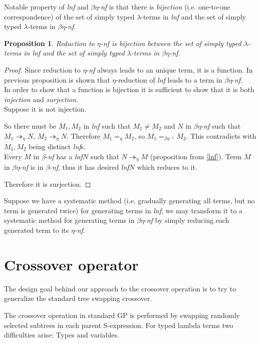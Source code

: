 \documentclass{sig-alternate}
\newtheorem{proposition}{Proposition}
\newcommand{\lterms}{$\lambda$-terms\xspace}
\newcommand{\etar}{\twoheadrightarrow_\eta}
\newcommand{\ered}{$\eta$-reduction\xspace}
\newcommand{\bnf}{$\beta$-\textit{nf}\xspace}
\newcommand{\enf}{$\eta$-\textit{nf}\xspace}
\newcommand{\benf}{$\beta\eta$-\textit{nf}\xspace}
\newcommand{\lnf}{\textit{lnf}\xspace}
\begin{document}
Notable property of \lnf and \benf is that there is \textit{bijection} 
(i.e. one-to-one correspondence) of 
the set of simply typed \lterms in \lnf and 
the set of simply typed \lterms in \benf.

\begin{proposition}

Reduction to \enf is bijection between  
the set of simply typed \lterms in \lnf and 
the set of simply typed \lterms in \benf.
\end{proposition}
\begin{proof}

Since reduction to \enf always leads to an unique term, it is a function.
In previous proposition is shown that \ered of \lnf
leads to a term in \benf.\\

In order to show that a function is bijection it is sufficient to show that it is
both \textit{injection} and \textit{surjection}.\\

Suppose it is not injection.

So there must be $M_1,M_2$ in \lnf such that $M_1 \not= M_2$
and $N$ in \benf such that $M_1 \etar N$, $M_2 \etar N$.
Therefore $M_1 =_\eta M_2$, 
so $M_1 =_{\beta\eta^{-1}} M_2$.
This contradicts with $M_1,M_2$ being distinct \lnf{}s.\\

Every $M$ in \bnf has a \lnf $N$ such that 
$N \twoheadrightarrow_{\eta} M$ (proposition from \ref{lnf}).
Term $M$ in \benf is in \bnf, thus it has desired \lnf $N$
which reduces to it. 

Therefore it is surjection. 
\end{proof}

Suppose we have a systematic method (i.e. gradually generating all terms, but no term is generated twice) for generating terms in \lnf,
we may transform it to a systematic method for generating terms in \benf by simply reducing each generated term to its \enf.  


\section{Crossover operator}
\label{crossover}

The design goal behind our approach to the crossover operation is
to try to generalize the standard tree swapping crossover.


The crossover operation in standard GP is performed 
by swapping randomly selected subtrees in each parent 
S-expression.
For typed lambda terms two difficulties arise: Types and variables.
\end{document}

